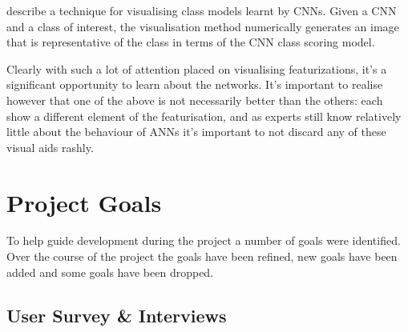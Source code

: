 \documentclass[a4paper,11pt,titlepage]{article}
\begin{document}
		\par 
		\textbf{\cite{Simonyan2013}} describe a technique for visualising class models learnt by CNNs. Given a CNN and a class of interest, the visualisation method numerically generates an image that is representative of the class in terms of the CNN class scoring model.
		\par 
		Clearly with such a lot of attention placed on visualising featurizations, it's a significant opportunity to learn about the networks. It's important to realise however that one of the above is not necessarily better than the others: each show a different element of the featurisation, and as experts still know relatively little about the behaviour of ANNs it's important to not discard any of these visual aids rashly.

\clearpage 

\section{Project Goals}
	To help guide development during the project a number of goals were identified. Over the course of the project the goals have been refined, new goals have been added and some goals have been dropped.
	\subsection{User Survey \& Interviews}
\end{document}
